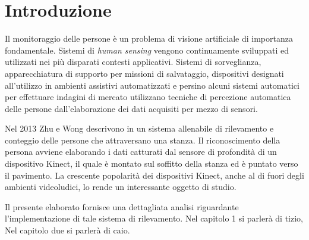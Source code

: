 
\chapter*{Introduzione}
\label{cap:Introduzione}
Il monitoraggio delle persone è un problema di visione artificiale di importanza fondamentale.
Sistemi di \emph{human sensing} vengono continuamente sviluppati ed utilizzati nei più disparati contesti applicativi. Sistemi di sorveglianza, apparecchiatura di supporto per missioni di salvataggio, dispositivi designati all'utilizzo in ambienti assistivi automatizzati e persino alcuni sistemi automatici per effettuare indagini di mercato utilizzano tecniche di percezione automatica delle persone dall'elaborazione dei dati acquisiti per mezzo di sensori.

Nel 2013 Zhu e Wong descrivono in \cite{Zhu13} un sistema allenabile di rilevamento e conteggio delle persone che attraversano una stanza.
Il riconoscimento della persona avviene elaborando i dati catturati dal sensore di profondità di un dispositivo Kinect, il quale è montato sul soffitto della stanza ed è puntato verso il pavimento. La crescente popolarità dei dispositivi Kinect, anche al di fuori degli ambienti videoludici, lo rende un interessante oggetto di studio.

Il presente elaborato fornisce una dettagliata analisi riguardante l'implementazione di tale sistema di rilevamento.
Nel capitolo 1 si parlerà di tizio, Nel capitolo due si parlerà di caio.
